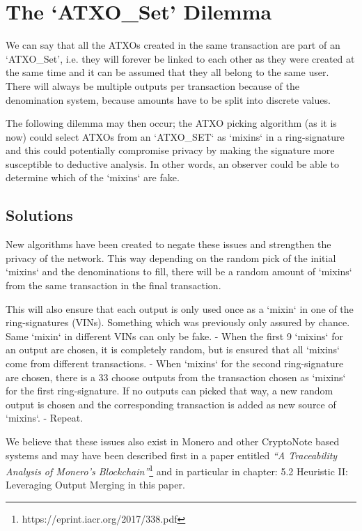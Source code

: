 \section{The ‘ATXO\_Set’ Dilemma}

We can say that all the ATXOs created in the same transaction are part of an ‘ATXO\_Set’, i.e. they will 
forever be linked to each other as they were created at the same time and it can be assumed that they all 
belong to the same user. There will always be multiple outputs per transaction because of the 
denomination system, because amounts have to be split into discrete values. 



The following dilemma may then occur; the ATXO picking algorithm (as it is now) could select ATXOs from 
an ‘ATXO\_SET‘ as ‘mixins‘ in a ring-signature and this could potentially compromise privacy by making the 
signature more susceptible to deductive analysis. In other words, an observer could be able to determine 
which of the ‘mixins‘ are fake. 



\subsection{Solutions}
New algorithms have been created to negate these issues and strengthen the privacy of the network. This 
way depending on the random pick of the initial ‘mixins‘ and the denominations to fill, there will be a 
random amount of ‘mixins‘ from the same transaction in the final transaction. 



This will also ensure that each output is only used once as a ‘mixin‘ in one of the ring-signatures (VINs). 
Something which was previously only assured by chance. Same ‘mixin‘ in different VINs can only be fake. 
- When the first 9 ‘mixins‘ for an output are chosen, it is completely random, but is ensured that all ‘mixins‘ 
come from different transactions. 
- When ‘mixins‘ for the second ring-signature are chosen, there is a 33%
choose outputs from the transaction chosen as ‘mixins‘ for the first ring-signature. If no outputs can 
picked that way, a new random output is chosen and the corresponding transaction is added as new 
source of ‘mixins‘. 
- Repeat. 



We believe that these issues also exist in Monero and other CryptoNote based systems and may have been 
described first in a paper entitled \textit{“A Traceability Analysis of Monero’s Blockchain”}\footnote{https://eprint.iacr.org/2017/338.pdf} and in particular in 
chapter: 5.2 Heuristic II: Leveraging Output Merging in this paper.
